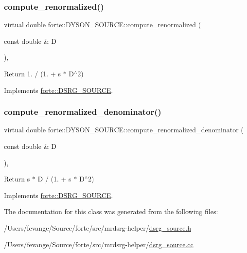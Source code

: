 \subsubsection{\texorpdfstring{compute\+\_\+renormalized()}{compute\_renormalized()}}
{\footnotesize\ttfamily virtual double forte\+::\+D\+Y\+S\+O\+N\+\_\+\+S\+O\+U\+R\+C\+E\+::compute\+\_\+renormalized (\begin{DoxyParamCaption}\item[{const double \&}]{D }\end{DoxyParamCaption})\hspace{0.3cm}{\ttfamily [inline]}, {\ttfamily [virtual]}}



Return 1. / (1. + s $\ast$ D$^\wedge$2) 



Implements \mbox{\hyperlink{classforte_1_1_d_s_r_g___s_o_u_r_c_e_a8b4c4428bb50af4561c256e3180f6b31}{forte\+::\+D\+S\+R\+G\+\_\+\+S\+O\+U\+R\+CE}}.

\mbox{\label{classforte_1_1_d_y_s_o_n___s_o_u_r_c_e_a2da089db945ae849b5d733493a5b8d39}} 
\subsubsection{\texorpdfstring{compute\+\_\+renormalized\+\_\+denominator()}{compute\_renormalized\_denominator()}}
{\footnotesize\ttfamily virtual double forte\+::\+D\+Y\+S\+O\+N\+\_\+\+S\+O\+U\+R\+C\+E\+::compute\+\_\+renormalized\+\_\+denominator (\begin{DoxyParamCaption}\item[{const double \&}]{D }\end{DoxyParamCaption})\hspace{0.3cm}{\ttfamily [inline]}, {\ttfamily [virtual]}}



Return s $\ast$ D / (1. + s $\ast$ D$^\wedge$2) 



Implements \mbox{\hyperlink{classforte_1_1_d_s_r_g___s_o_u_r_c_e_a7345ba63c3612369be7c4cc896b7d5c4}{forte\+::\+D\+S\+R\+G\+\_\+\+S\+O\+U\+R\+CE}}.



The documentation for this class was generated from the following files\+:\begin{DoxyCompactItemize}
\item 
/\+Users/fevange/\+Source/forte/src/mrdsrg-\/helper/\mbox{\hyperlink{dsrg__source_8h}{dsrg\+\_\+source.\+h}}\item 
/\+Users/fevange/\+Source/forte/src/mrdsrg-\/helper/\mbox{\hyperlink{dsrg__source_8cc}{dsrg\+\_\+source.\+cc}}\end{DoxyCompactItemize}
